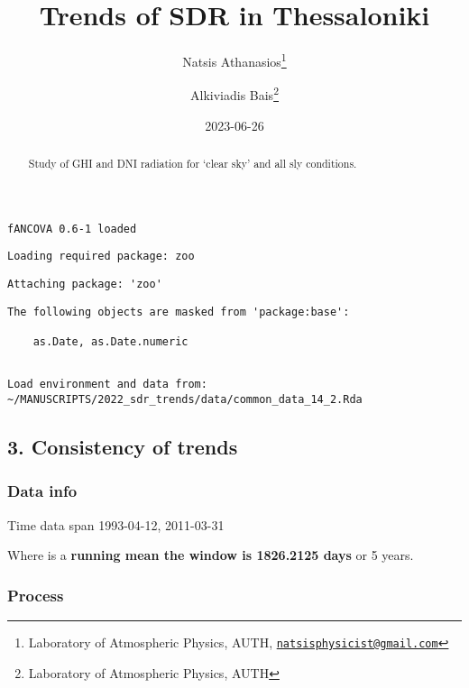 \documentclass[
  10pt,
  a4paper,oneside]{article}
\title{Trends of SDR in Thessaloniki}
\author{Natsis Athanasios\footnote{Laboratory of Atmospheric Physics, AUTH, \href{mailto:natsisphysicist@gmail.com}{\nolinkurl{natsisphysicist@gmail.com}}} \and Alkiviadis Bais\footnote{Laboratory of Atmospheric Physics, AUTH}}
\date{2023-06-26}
\begin{document}
\maketitle
\begin{abstract}
Study of GHI and DNI radiation for `clear sky' and all sly conditions.
\end{abstract}

{
\hypersetup{linkcolor=}
\setcounter{tocdepth}{4}
\tableofcontents
}
\begin{verbatim}
fANCOVA 0.6-1 loaded
\end{verbatim}

\begin{verbatim}
Loading required package: zoo
\end{verbatim}

\begin{verbatim}
Attaching package: 'zoo'
\end{verbatim}

\begin{verbatim}
The following objects are masked from 'package:base':

    as.Date, as.Date.numeric
\end{verbatim}

\begin{verbatim}

Load environment and data from:  ~/MANUSCRIPTS/2022_sdr_trends/data/common_data_14_2.Rda 
\end{verbatim}

\hypertarget{consistency-of-trends}{%
\subsection{3. Consistency of trends}\label{consistency-of-trends}}

\hypertarget{data-info}{%
\subsubsection{Data info}\label{data-info}}

Time data span 1993-04-12, 2011-03-31

Where is a \textbf{running mean the window is 1826.2125 days} or
5 years.

\hypertarget{process}{%
\subsubsection{Process}\label{process}}

\newpage
\FloatBarrier
\end{document}
